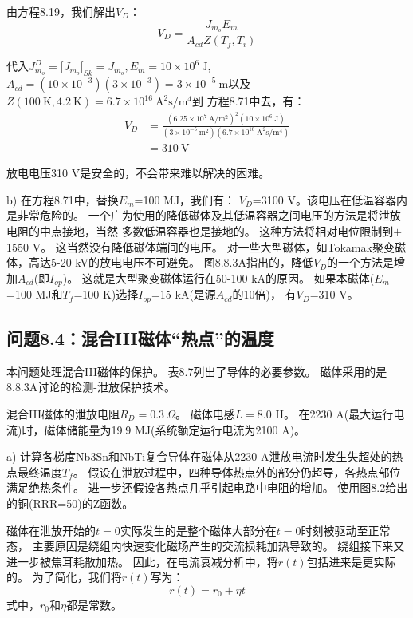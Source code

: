 由方程8.19，我们解出$V_D$：
\begin{equation}%
V_D=\frac{J_{m_o}E_m}{A_{cd}Z(T_f,T_i)}
\end{equation}

代入$J_{m_o}^D=[J_{m_o}[_{Sk}=J_{m_o}, E_m=10\times 10^6\ \mathrm{J}$,
$A_{cd}=(10\times 10^{-3})(3\times 10^{-3})=3\times 10^{-5}\ \mathrm{m}$以及
$Z(100\ \mathrm{K},4.2\ \mathrm{K})=6.7\times 10^{16}\ \mathrm{A^2 s/m^4}$到
方程8.71中去，有：
\begin{align*}%
V_D&=\frac{(6.25\times 10^7\ \mathrm{A/m^2})^2(10\times 10^6\ \mathrm{J})}{(3\times 10^{-5}\ \mathrm{m^2})(6.7\times 10^{16}\ \mathrm{A^2s/m^4})} \\\tag{S3.1}
&=310\ \mathrm{V} 
\end{align*}

放电电压310 V是安全的，不会带来难以解决的困难。

b) 在方程8.71中，替换$E_m$=100 MJ，我们有：
$V_D$=3100 V。该电压在低温容器内是非常危险的。
一个广为使用的降低磁体及其低温容器之间电压的方法是将泄放电阻的中点接地，当然
多数低温容器也是接地的。
这种方法将相对电位限制到$\pm$1550 V。
这当然没有降低磁体端间的电压。
对一些大型磁体，如Tokamak聚变磁体，高达5-20 kV的放电电压不可避免。
图8.8.3A指出的，降低$V_D$的一个方法是增加$A_{cd}$(即$I_{op}$)。
这就是大型聚变磁体运行在50-100 kA的原因。
如果本磁体($E_m$=100 MJ和$T_f$=100 K)选择$I_{op}$=15 kA(是源$A_{cd}$的10倍)，
有$V_D$=310 V。


\subsection{问题8.4：混合III磁体“热点”的温度}
本问题处理混合III磁体的保护。
表8.7列出了导体的必要参数。
磁体采用的是8.8.3A讨论的检测-泄放保护技术。

混合III磁体的泄放电阻$R_D=0.3\ \Omega$。
磁体电感$L=8.0$ H。
在2230 A(最大运行电流)时，磁体储能量为19.9 MJ(系统额定运行电流为2100 A)。

a) 计算各梯度Nb3Sn和NbTi复合导体在磁体从2230 A泄放电流时发生失超处的热点最终温度$T_f$。
假设在泄放过程中，四种导体热点外的部分仍超导，各热点部位满足绝热条件。
进一步还假设各热点几乎引起电路中电阻的增加。
使用图8.2给出的铜(RRR=50)的Z函数。

磁体在泄放开始的$t=0$实际发生的是整个磁体大部分在$t=0$时刻被驱动至正常态，
主要原因是绕组内快速变化磁场产生的交流损耗加热导致的。
绕组接下来又进一步被焦耳耗散加热。
因此，在电流衰减分析中，将$r(t)$包括进来是更实际的。
为了简化，我们将$r(t)$写为：
\begin{equation}%
r(t)=r_0+\eta t
\end{equation}
式中，$r_0$和$\eta$都是常数。

